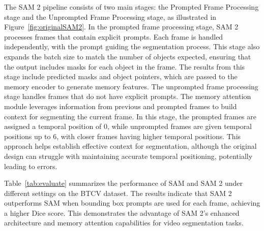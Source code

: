 The SAM 2 pipeline consists of two main stages: the Prompted Frame Processing stage and the Unprompted Frame Processing stage, as illustrated in Figure~\ref{fig:originalSAM2}.
%
In the prompted frame processing stage, SAM 2 processes frames that contain explicit prompts. Each frame is handled independently, with the prompt guiding the segmentation process. This stage also expands the batch size to match the number of objects expected, ensuring that the output includes masks for each object in the frame. The results from this stage include predicted masks and object pointers, which are passed to the memory encoder to generate memory features.
%
The unprompted frame processing stage handles frames that do not have explicit prompts. The memory attention module leverages information from previous and prompted frames to build context for segmenting the current frame. In this stage, the prompted frames are assigned a temporal position of 0, while unprompted frames are given temporal positions up to 6, with closer frames having higher temporal positions. This approach helps establish effective context for segmentation, although the original design can struggle with maintaining accurate temporal positioning, potentially leading to errors.

Table~\ref{tab:evaluate} summarizes the performance of SAM and SAM 2 under different settings on the BTCV dataset. The results indicate that SAM 2 outperforms SAM when bounding box prompts are used for each frame, achieving a higher Dice score. This demonstrates the advantage of SAM 2’s enhanced architecture and memory attention capabilities for video segmentation tasks.

